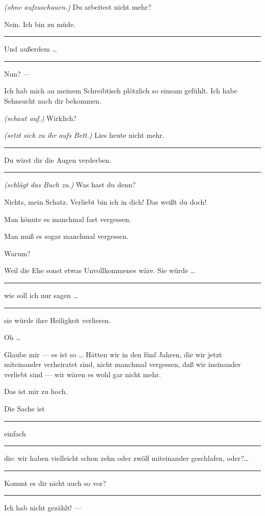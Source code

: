 \documentclass[
	final,
	a4paper,
	ngerman,
	mpinclude = true, %
	twoside = true,
	open = right,
	cleardoublepage = plain,
	DIV = 13,
	BCOR = 1cm,
	titlepage = firstiscover,
	]{scrbook}
\newcommand{\direction}[1]{\textit{(#1)}}
\newenvironment{deletion}{%
		\vspace{0.25\baselineskip}
		\hrule
		\vspace{0.25\baselineskip}
		\color{darkgray}
	}{
		\color{black}
		\vspace{0.25\baselineskip}
		\hrule 
		\vspace{0.25\baselineskip}
	}
\newcommand{\thecharacter}[1]{\textup{\textsc{#1}}\xspace}
\newcommand{\thefrau}{\thecharacter{Junge Frau}}
\newcommand{\thegatte}{\thecharacter{Gatte}}
\newcommand{\character}[1]{\item[#1:]}
\newcommand{\frau}{\character{\thefrau}}
\newcommand{\gatte}{\character{\thegatte}}
\begin{document}
\begin{play}

	\frau
	\direction{ohne aufzuschauen.} Du arbeitest nicht mehr?

	\gatte
	Nein. Ich bin zu müde.
	\begin{deletion}
	Und außerdem \ldots{}
	\end{deletion}

	\frau
	Nun? ---

	\gatte
	Ich hab mich an meinem Schreibtisch plötzlich so einsam gefühlt. Ich habe Sehnsucht nach dir bekommen.

	\frau
	\direction{schaut auf.} Wirklich?

	\gatte
	\direction{setzt sich zu ihr aufs Bett.} Lies heute nicht mehr.
	\begin{deletion}
	Du wirst dir die Augen verderben.
	\end{deletion}

	\frau
	\direction{schlägt das Buch zu.} Was hast du denn?

	\gatte
	Nichts, mein Schatz. Verliebt bin ich in dich! Das weißt du doch!

	\frau
	Man könnte es manchmal fast vergessen.

	\gatte
	Man muß es sogar manchmal vergessen.

	\frau
	Warum?

	\gatte
	Weil die Ehe sonst etwas Unvollkommenes wäre. Sie würde \ldots{}
	\begin{deletion}
		wie soll ich nur sagen \ldots{}
	\end{deletion}
	sie würde ihre Heiligkeit verlieren.

	\frau
	Oh \ldots{}

	\gatte
	Glaube mir --- es ist so \ldots{} Hätten wir in den fünf Jahren, die wir jetzt miteinander verheiratet sind, nicht manchmal vergessen, daß wir ineinander verliebt sind --- wir wären es wohl gar nicht mehr.

	\frau
	Das ist mir zu hoch.

	\gatte
	Die Sache ist
	\begin{deletion}
		einfach
	\end{deletion}
	die: wir haben vielleicht schon zehn oder zwölf miteinander geschlafen, oder?\ldots{}
	\begin{deletion}
		Kommt es dir nicht auch so vor?
	\end{deletion}

	\frau
	Ich hab nicht gezählt! ---


\end{play}
\end{document}
